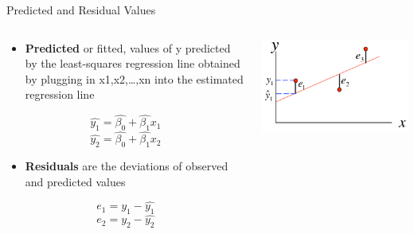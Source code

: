 \documentclass[australian,ignorenonframetext,aspectratio=169]{beamer}
\providecommand{\tightlist}{%
  \setlength{\itemsep}{0pt}\setlength{\parskip}{0pt}}
\begin{document}
\begin{frame}{Predicted and Residual Values}
\protect\hypertarget{predicted-and-residual-values}{}

\begin{columns}[T]
\begin{column}{0.5\textwidth}
\tiny

\begin{itemize}
\tightlist
\item
  \textbf{Predicted} or fitted, values of y predicted by the
  least-squares regression line obtained by plugging in
  x1,x2,\ldots{},xn into the estimated regression line
\end{itemize}

\[\hat{y_1} = \hat{\beta_0} + \hat{\beta_1}x_1\]
\[\hat{y_2} = \hat{\beta_0} + \hat{\beta_1}x_2\]

\begin{itemize}
\tightlist
\item
  \textbf{Residuals} are the deviations of observed and predicted values
\end{itemize}

\[e_1 = y_1 - \hat{y_1}\] \[e_2 = y_2 - \hat{y_2}\]
\end{column}

\begin{column}{0.5\textwidth}
\begin{center}\includegraphics[width=1\linewidth]{../graphs/predicted} \end{center}
\end{column}
\end{columns}

\end{frame}
\end{document}
